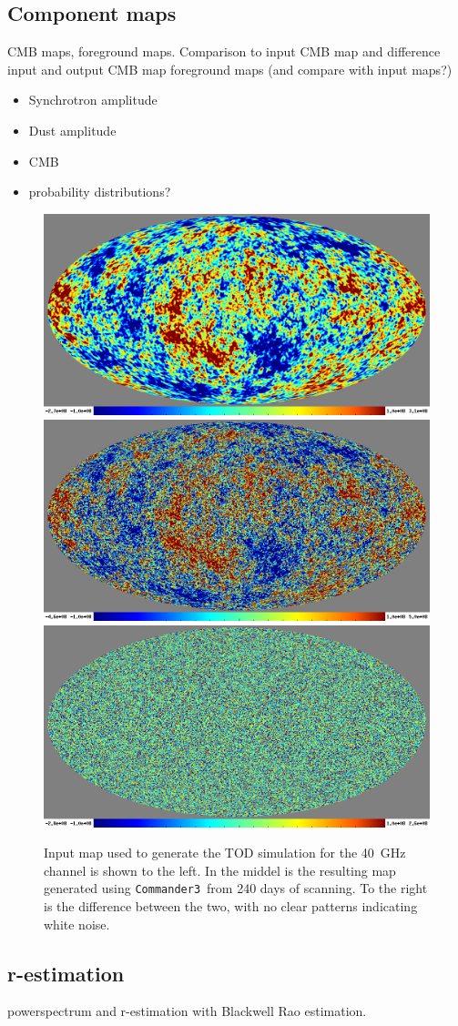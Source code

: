 \documentclass[twocolumn]{aa}
\def\commanderthree{\texttt{Commander3}}
\begin{document}
\subsection{Component maps}
CMB maps, foreground maps. Comparison to input
CMB map and difference input and output CMB map
foreground maps (and compare with input maps?)
\begin{itemize}
	\item Synchrotron amplitude
	\item Dust amplitude
	\item CMB
	\item probability distributions?
\end{itemize}

\begin{figure}[t]
  \center
    \includegraphics[width=0.33\linewidth]{figs/test_map_N256_10E5.png}
    \includegraphics[width=0.33\linewidth]{figs/chains_LB_240d_40GHz_tod_040_map_c0001_k000002.png}
    \includegraphics[width=0.33\linewidth]{figs/chains_LB_240d_40GHz_diff_todmap2_testmapE5.png}
  \caption{Input map used to generate the TOD simulation for the 40~GHz channel is shown to the left. In the middel is the resulting map generated using \commanderthree\ from 240 days of scanning. To the right is the difference between the two, with no clear patterns indicating white noise.}
  \label{fig:planck_cmb_cl}  
\end{figure}

\subsection{r-estimation}
powerspectrum and r-estimation with Blackwell Rao estimation. 
\end{document}

